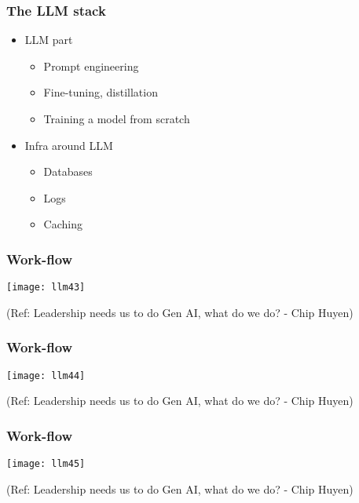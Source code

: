 \begin{frame}[fragile]\frametitle{The LLM stack}

\begin{itemize}
\item LLM part
	\begin{itemize}
	\item Prompt engineering
	\item Fine-tuning, distillation
	\item Training a model from scratch
	\end{itemize}	
\item Infra around LLM
	\begin{itemize}
	\item Databases
	\item Logs
	\item Caching
	\end{itemize}
\end{itemize}	

\end{frame}

\begin{frame}[fragile]\frametitle{Work-flow}

\begin{center}
\texttt{[image: llm43]}

{\tiny (Ref: Leadership needs us to do Gen AI, what do we do? - Chip Huyen)}
\end{center}
\end{frame}

\begin{frame}[fragile]\frametitle{Work-flow}

\begin{center}
\texttt{[image: llm44]}

{\tiny (Ref: Leadership needs us to do Gen AI, what do we do? - Chip Huyen)}
\end{center}
\end{frame}

\begin{frame}[fragile]\frametitle{Work-flow}

\begin{center}
\texttt{[image: llm45]}

{\tiny (Ref: Leadership needs us to do Gen AI, what do we do? - Chip Huyen)}
\end{center}
\end{frame}

